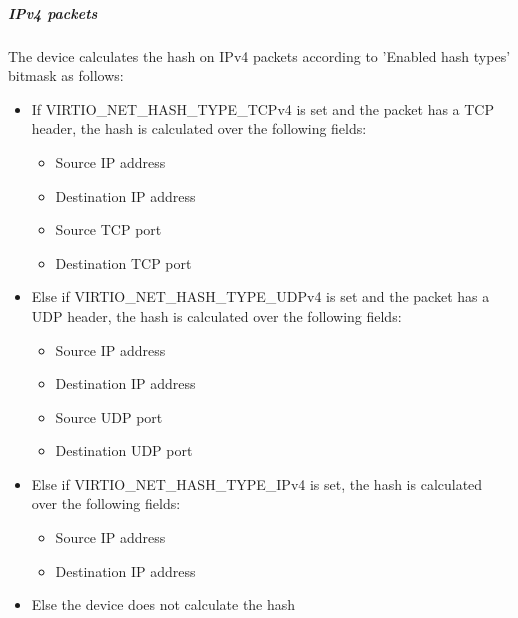 \subparagraph{IPv4 packets}
\label{sec:Device Types / Network Device / Device Operation / Processing of Incoming Packets / Hash calculation for incoming packets / IPv4 packets}
The device calculates the hash on IPv4 packets according to 'Enabled hash types' bitmask as follows:
\begin{itemize}
\item If VIRTIO_NET_HASH_TYPE_TCPv4 is set and the packet has
a TCP header, the hash is calculated over the following fields:
\begin{itemize}
\item Source IP address
\item Destination IP address
\item Source TCP port
\item Destination TCP port
\end{itemize}
\item Else if VIRTIO_NET_HASH_TYPE_UDPv4 is set and the
packet has a UDP header, the hash is calculated over the following fields:
\begin{itemize}
\item Source IP address
\item Destination IP address
\item Source UDP port
\item Destination UDP port
\end{itemize}
\item Else if VIRTIO_NET_HASH_TYPE_IPv4 is set, the hash is
calculated over the following fields:
\begin{itemize}
\item Source IP address
\item Destination IP address
\end{itemize}
\item Else the device does not calculate the hash
\end{itemize}

